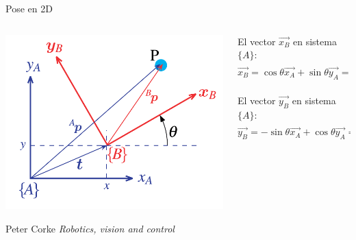 \documentclass[presentation,aspectratio=169]{beamer}
\newcommand*{\refsys}[1]{\ensuremath{\{#1\}}}
\begin{document}
\begin{frame}[label={sec:org90995d3}]{Pose en 2D}
\begin{columns}
\begin{column}{0.2\columnwidth}
\begin{center}
\includegraphics[height=0.3\textheight]{../figures/Corke-fig2.6.png}

\footnotesize Peter Corke \emph{Robotics, vision and control}
\end{center}
\end{column}

\begin{column}{0.8\columnwidth}
\small 

El vector \(\vec{x_B}\) en sistema \refsys{A}: \[ \vec{x_B} = \cos\theta \vec{x_A} +\sin\theta\vec{y_A} =
\begin{bmatrix}\vec{x_A} & \vec{y_A} \end{bmatrix} \begin{bmatrix} \cos\theta\\\sin\theta \end{bmatrix}\]

\pause
El vector \(\vec{y_B}\) en sistema \refsys{A}: \[ \vec{y_B} = -\sin\theta \vec{x_A} +\cos\theta\vec{y_A} =
\begin{bmatrix}\vec{x_A} & \vec{y_A} \end{bmatrix} \begin{bmatrix} -\sin\theta\\\cos\theta \end{bmatrix}\]


\end{column}
\end{columns}
\end{frame}
\end{document}
